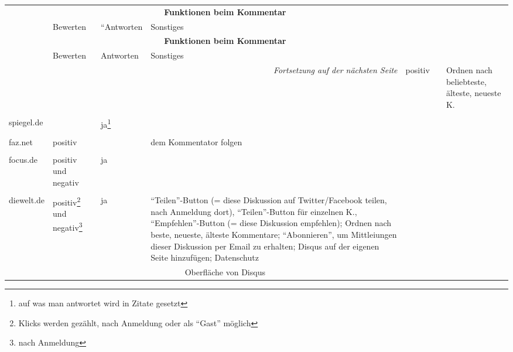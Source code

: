 \begin{landscape} \footnotesize
  \begin{longtable}{l|p{40mm}p{40mm}p{80mm}}

  & \multicolumn{3}{c}{\bfseries Funktionen beim Kommentar} \\
  & Bewerten & ``Antworten & Sonstiges \\\hline
  \endfirsthead

  & \multicolumn{3}{c}{\bfseries Funktionen beim Kommentar} \\
  &  Bewerten & Antworten & Sonstiges \\\hline
  \endhead

  \hline \multicolumn{4}{r}{\emph{Fortsetzung auf der nächsten Seite}}
  \endfoot

  \hline
  \endlastfoot



\hline

  bild.de &
    positiv & & Ordnen nach beliebteste, älteste, neueste K.\\
    & \multicolumn{3}{c}{}\\\hline

  spiegel.de &
  & ja\footnote{auf was man antwortet wird in Zitate gesetzt} & \\
  & \multicolumn{3}{c}{}\\\hline

  faz.net & positiv & & dem Kommentator folgen \\
          & \multicolumn{3}{c}{}\\\hline

  focus.de & positiv und negativ & ja & \\
           & \multicolumn{3}{c}{}\\\hline

  diewelt.de &
    positiv\footnote{Klicks werden gezählt, nach Anmeldung oder als ``Gast'' möglich}
    und negativ\footnote{nach Anmeldung} &
    ja &
    ``Teilen''-Button (= diese Diskussion auf Twitter/Facebook teilen, nach
    Anmeldung dort), ``Teilen''-Button für einzelnen K., ``Empfehlen''-Button (=
    diese Diskussion empfehlen); Ordnen nach beste, neueste, älteste Kommentare;
    ``Abonnieren'', um Mittleiungen dieser Diskussion per Email zu erhalten;
    Disqus auf der eigenen Seite hinzufügen; Datenschutz\\
    & \multicolumn{3}{c}{Oberfläche von Disqus}\\\hline


\end{longtable}
\end{landscape}
